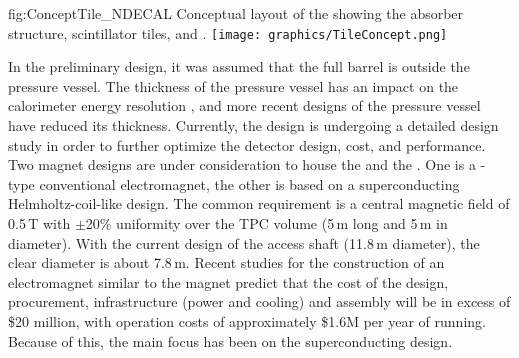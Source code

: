 \begin{dunefigure}[Conceptual layout of the \dshort{mpd} \dshort{ecal}] %
{fig:ConceptTile_NDECAL}
{Conceptual layout of the  showing the absorber structure, scintillator tiles,  and .}
\texttt{[image: graphics/TileConcept.png]}
\end{dunefigure}

In the preliminary design, it was assumed that the full  barrel is outside the pressure vessel.  The thickness of the pressure vessel has an impact on the calorimeter energy resolution \cite{Emberger:2018pgr}, and more recent designs of the pressure vessel have reduced its thickness.
Currently, the  design is undergoing a detailed design study in order to further optimize the detector design, cost, and performance.  
%
\label{sssec:nd:appx:mpd-magnet}
%
Two magnet designs are under consideration to house the  and the . One is a -type conventional electromagnet, the other is based on a superconducting Helmholtz-coil-like design. The common requirement is a central magnetic field of 0.5\,T with $\pm$20\% uniformity over the TPC volume (5\,m long and 5\,m in diameter). With the current design of the access shaft (11.8\,m diameter), the clear diameter is about 7.8\,m. Recent studies for the construction of an electromagnet similar to the  magnet predict that the cost of the design, procurement, infrastructure (power and cooling) and assembly will be in excess of \$20 million, with operation costs of approximately \$1.6M per year of running.  Because of this, the main focus has been on the superconducting design.
%

